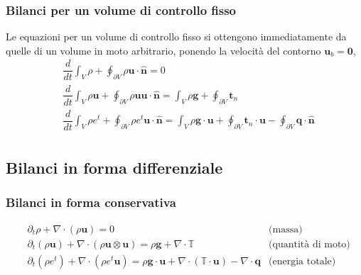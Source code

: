 \subsubsection{Bilanci per un volume di controllo fisso}
Le equazioni per un volume di controllo fisso si ottengono immediatamente da quelle di un volume in moto arbitrario, ponendo la velocità del contorno $\mathbf{u}_b = \mathbf{0}$,
\begin{equation}
\begin{aligned}
    & \dfrac{d}{dt} \int_{V} \rho + \oint_{\partial V} \rho \mathbf{u} \cdot \mathbf{\hat{n}} = 0 \\ 
    & \dfrac{d}{dt} \int_{V} \rho \mathbf{u} + \oint_{\partial V} \rho \mathbf{u} \mathbf{u} \cdot \mathbf{\hat{n}} = \int_{V} \rho \mathbf{g} + \oint_{\partial V} \mathbf{t}_n \\
    & \dfrac{d}{dt} \int_{V} \rho e^t + \oint_{\partial V} \rho e^t \mathbf{u} \cdot \mathbf{\hat{n}} = \int_{V} \rho \mathbf{g} \cdot \mathbf{u} + \oint_{\partial V} \mathbf{t}_n \cdot \mathbf{u} - \oint_{\partial V} \mathbf{q} \cdot \mathbf{\hat{n}} \\
\end{aligned}
\end{equation}

\subsection{Bilanci in forma differenziale}
\subsubsection{Bilanci in forma conservativa}
\begin{equation}
\begin{aligned}
    & \partial_t \rho + \nabla \cdot (\rho \mathbf{u}) = 0  &  \text{(massa)} \\
    & \partial_t \left( \rho \mathbf{u} \right) + \nabla \cdot \left(\rho \mathbf{u} \otimes \mathbf{u} \right) = \rho \mathbf{g} + \nabla \cdot \mathbb{T}  &  \text{(quantità di moto)} \\
    & \partial_t \left( \rho e^t \right) + \nabla \cdot \left(\rho e^t \mathbf{u}\right) = \rho \mathbf{g} \cdot \mathbf{u} + \nabla \cdot \left( \mathbb{T} \cdot \mathbf{u} \right) - \nabla \cdot \mathbf{q}  &  \text{(energia totale)} \\
\end{aligned}
\end{equation}
